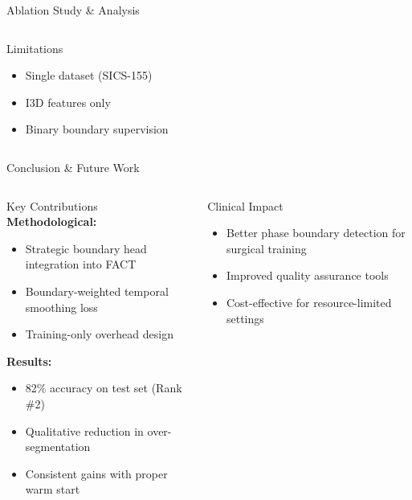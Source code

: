\documentclass[9pt,aspectratio=169]{beamer}
\newcommand{\factmodel}{\textsc{FACT}\xspace}
\begin{document}
\begin{frame}[label=slide9]{Ablation Study \& Analysis}
\begin{columns}[T,onlytextwidth]
      \vspace{0.5em}
      \begin{block}{Limitations}
        \begin{itemize}
          \item Single dataset (SICS-155)
          \item I3D features only
          \item Binary boundary supervision
        \end{itemize}
      \end{block}
  \end{columns}
\end{frame}

\begin{frame}[label=slide10]{Conclusion \& Future Work}
  \begin{columns}[T,onlytextwidth]
      \begin{block}{Key Contributions}
        \textbf{Methodological:}
        \begin{itemize}
          \item Strategic boundary head integration into \factmodel
          \item Boundary-weighted temporal smoothing loss
          \item Training-only overhead design
        \end{itemize}
        
        \textbf{Results:}
        \begin{itemize}
          \item 82\% accuracy on test set (Rank \#2)
          \item Qualitative reduction in over-segmentation
          \item Consistent gains with proper warm start
        \end{itemize}
      \end{block}
      
      \begin{block}{Clinical Impact}
        \begin{itemize}
          \item Better phase boundary detection for surgical training
          \item Improved quality assurance tools
          \item Cost-effective for resource-limited settings
        \end{itemize}
      \end{block}
      

\end{columns}
\end{frame}
\end{document}
